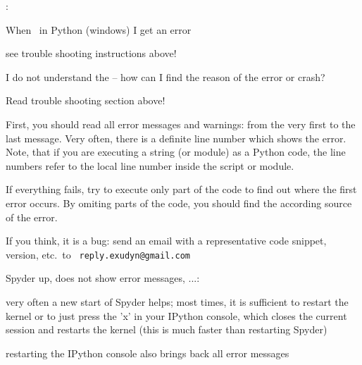\ei
\ei \vspace{12pt}
:
\bn
\item When  \codeName\ in Python (windows) I get an error 
\bi
\item[$\ra$] see trouble shooting instructions above!
\ei
\item I do not understand the  -- how can I find the reason of the error or crash?
\bi
\item[$\ra$] Read trouble shooting section above!	
\item[$\ra$] First, you should read all error messages and warnings: from the very first to the last message. Very often, there is a definite line number which shows the error. Note, that if you are executing a string (or module) as a Python code, the line numbers refer to the local line number inside the script or module.
\item[$\ra$] If everything fails, try to execute only part of the code to find out where the first error occurs. By omiting parts of the code, you should find the according source of the error.
\item[$\ra$] If you think, it is a bug: send an email with a representative code snippet, version, etc.\ to \texttt{ reply.exudyn@gmail.com}
\ei
\item Spyder  up, does not show error messages, ...:
\bi
\item[$\ra$] very often a new start of Spyder helps; most times, it is sufficient to restart the kernel or to just press the 'x' in your IPython console, which closes the current session and restarts the kernel (this is much faster than restarting Spyder)
\item[$\ra$] restarting the IPython console also brings back all error messages
\ei
